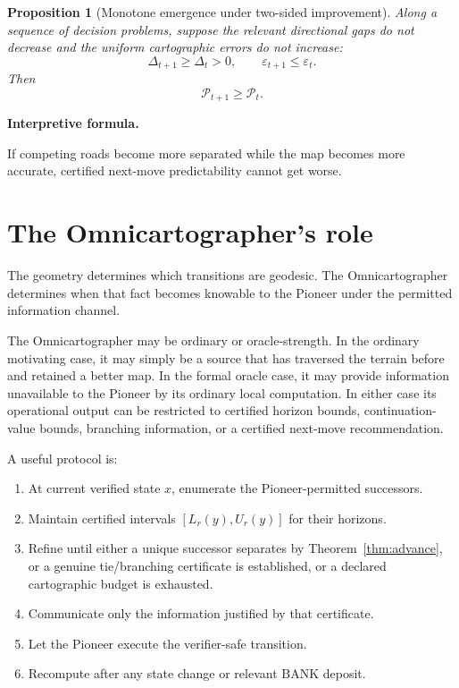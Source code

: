 \documentclass[11pt]{article}
\newtheorem{proposition}[theorem]{Proposition}
\theoremstyle{definition}
\theoremstyle{remark}
\newcommand{\BANK}{\mathrm{BANK}}
\newcommand{\Gap}{\Delta}
\newcommand{\eps}{\varepsilon}
\newenvironment{interpretiveformula}{%
  \begin{center}\begin{minipage}{0.92\linewidth}\small
  \textbf{Interpretive formula.}\ \raggedright}{\end{minipage}\end{center}}
\begin{document}
\begin{proposition}[Monotone emergence under two-sided improvement]
Along a sequence of decision problems, suppose the relevant directional gaps do not decrease and the uniform cartographic errors do not increase:
\[
\Gap_{t+1}\ge\Gap_t>0,\qquad \eps_{t+1}\le\eps_t.
\]
Then
\[
\mathcal P_{t+1}\ge\mathcal P_t.
\]
\end{proposition}

\begin{interpretiveformula}
If competing roads become more separated while the map becomes more accurate, certified next-move predictability cannot get worse.
\end{interpretiveformula}

\section{The Omnicartographer's role}
The geometry determines which transitions are geodesic. The Omnicartographer determines when that fact becomes knowable to the Pioneer under the permitted information channel.

The Omnicartographer may be ordinary or oracle-strength. In the ordinary motivating case, it may simply be a source that has traversed the terrain before and retained a better map. In the formal oracle case, it may provide information unavailable to the Pioneer by its ordinary local computation. In either case its operational output can be restricted to certified horizon bounds, continuation-value bounds, branching information, or a certified next-move recommendation.

A useful protocol is:
\begin{enumerate}
\item At current verified state $x$, enumerate the Pioneer-permitted successors.
\item Maintain certified intervals $[L_r(y),U_r(y)]$ for their horizons.
\item Refine until either a unique successor separates by Theorem~\ref{thm:advance}, or a genuine tie/branching certificate is established, or a declared cartographic budget is exhausted.
\item Communicate only the information justified by that certificate.
\item Let the Pioneer execute the verifier-safe transition.
\item Recompute after any state change or relevant $\BANK$ deposit.
\end{enumerate}
\end{document}
